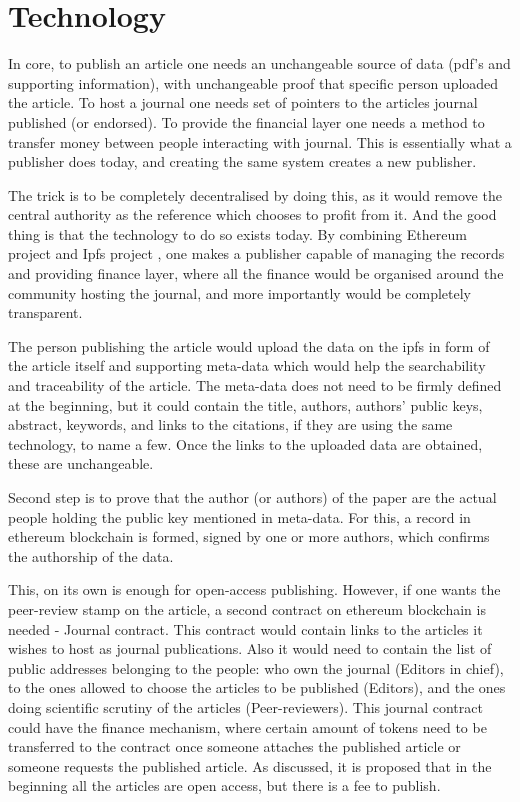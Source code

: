 \documentclass[12pt, a4paper]{article}
\begin{document}
\section{Technology}

In core, to publish an article one needs an unchangeable source of data (pdf's and supporting information), with unchangeable proof that specific person uploaded the article. To host a journal one needs set of pointers to the articles journal published (or endorsed). To provide the financial layer one needs a method to transfer money between people interacting with journal. This is essentially what a publisher does today, and creating the same system creates a new publisher.

The trick is to be completely decentralised by doing this, as it would remove the central authority as the reference which chooses to profit from it. And the good thing is that the technology to do so exists today. By combining Ethereum project \cite{ethereum-1} and Ipfs project \cite{ipfs-1}, one makes a publisher capable of managing the records and providing finance layer, where all the finance would be organised around the community hosting the journal, and more importantly would be completely transparent. 

The person publishing the article would upload the data on the ipfs in form of the article itself and supporting meta-data which would help the searchability and traceability of the article. The meta-data does not need to be firmly defined at the beginning, but it could contain the title, authors, authors' public keys, abstract, keywords, and links to the citations, if they are using the same technology, to name a few. Once the links to the uploaded data are obtained, these are unchangeable.

Second step is to prove that the author (or authors) of the paper are the actual people holding the public key mentioned in meta-data. For this, a record in ethereum blockchain is formed, signed by one or more authors, which confirms the authorship of the data.

This, on its own is enough for open-access publishing. However, if one wants the peer-review stamp on the article, a second contract on ethereum blockchain is needed - Journal contract. This contract would contain links to the articles it wishes to host as journal publications. Also it would need to contain the list of public addresses belonging to the people: who own the journal (Editors in chief), to the ones allowed to choose the articles to be published (Editors), and the ones doing scientific scrutiny of the articles (Peer-reviewers). This journal contract could have the finance mechanism, where certain amount of tokens need to be transferred to the contract once someone attaches the published article or someone requests the published article. As discussed, it is proposed that in the beginning all the articles are open access, but there is a fee to publish.
\end{document}

